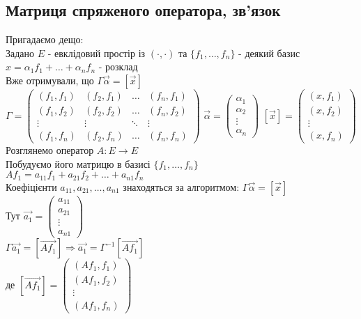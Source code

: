 \documentclass[a4paper, 14pt]{extarticle}
\begin{document}
\subsection{Матриця спряженого оператора, зв'язок}
Пригадаємо дещо:\\
Задано $E$ - евклідовий простір із $(\cdot, \cdot)$ та $\{f_1,\dots,f_n\}$ - деякий базис\\
$x = \alpha_1 f_1 + \dots + \alpha_n f_n$ - розклад\\
Вже отримували, що $\Gamma \vec{\alpha} = [\vec{x}]$\\
$\Gamma = \begin{pmatrix}
(f_1,f_1) & (f_2,f_1) & \dots & (f_n,f_1) \\
(f_1,f_2) & (f_2,f_2) & \dots & (f_n,f_2) \\
\vdots & \vdots & \ddots & \vdots \\
(f_1,f_n) & (f_2,f_n) & \dots & (f_n,f_n)
\end{pmatrix}$ \hspace{1cm}
$\vec{\alpha} = \begin{pmatrix}
\alpha_1 \\ \alpha_2 \\ \vdots \\ \alpha_n
\end{pmatrix}$ \hspace{1cm}
$[\vec{x}] = \begin{pmatrix}
(x,f_1) \\ (x,f_2) \\ \vdots \\ (x,f_n)
\end{pmatrix}$
\\
Розглянемо оператор $A: E \to E$\\
Побудуємо його матрицю в базисі $\{f_1,\dots,f_n\}$\\
$Af_1 = a_{11}f_1 + a_{21}f_2 + \dots + a_{n1}f_n$\\
Коефіцієнти $a_{11},a_{21},\dots,a_{n1}$ знаходяться за алгоритмом: $\Gamma \vec{\alpha} = [\vec{x}]$\\
Тут $\vec{a_1} = \begin{pmatrix}
a_{11} \\ a_{21} \\ \vdots \\ a_{n1}
\end{pmatrix}$\\
$\Gamma \vec{a_1} = [\vec{Af_1}] \Rightarrow \vec{a_1} = \Gamma^{-1} [\vec{Af_1}]$\\
де $[\vec{Af_1}] = \begin{pmatrix}
(Af_1,f_1) \\ (Af_1,f_2) \\ \vdots \\ (Af_1,f_n)
\end{pmatrix}$\\
\end{document}
